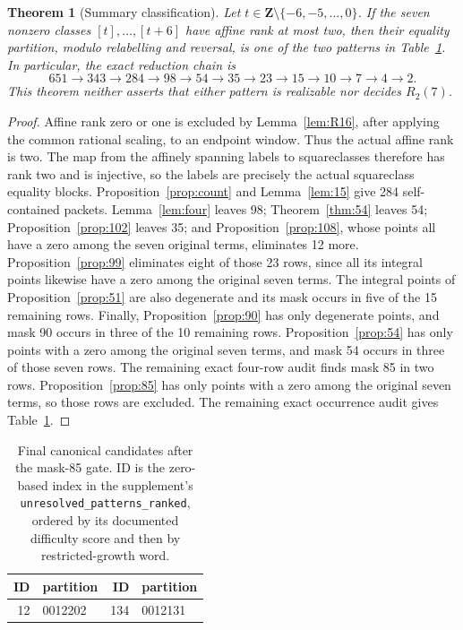 \documentclass[11pt]{article}
\newtheorem{theorem}{Theorem}
\begin{document}
\begin{theorem}[Summary classification]\label{thm:summary}
Let $t\in\mathbf Z\setminus\{-6,-5,\ldots,0\}$.  If the seven nonzero
classes $[t],\ldots,[t+6]$ have affine rank at most two, then their
equality partition, modulo relabelling and reversal, is one of the two
patterns in Table~\ref{tab:2}.  In particular, the exact reduction chain is
\[
651\longrightarrow343\longrightarrow284\longrightarrow98
\longrightarrow54\longrightarrow35\longrightarrow23\longrightarrow15
\longrightarrow10\longrightarrow7\longrightarrow4\longrightarrow2.
\]
This theorem neither asserts that either pattern is realizable nor
decides $R_2(7)$.
\end{theorem}
\begin{proof}
Affine rank zero or one is excluded by Lemma~\ref{lem:R16}, after applying
the common rational scaling, to an endpoint window.  Thus the actual affine
rank is two.  The map from the affinely spanning labels to squareclasses
therefore has rank two and is injective, so the labels are precisely the
actual squareclass equality blocks.  Proposition~\ref{prop:count} and
Lemma~\ref{lem:15} give 284 self-contained packets.  Lemma~\ref{lem:four}
leaves 98; Theorem~\ref{thm:54} leaves 54;
Proposition~\ref{prop:102} leaves 35; and Proposition~\ref{prop:108}, whose
points all have a zero among the seven original terms, eliminates 12 more.
Proposition~\ref{prop:99} eliminates eight of those 23 rows, since all its
integral points likewise have a zero among the original seven terms. The
integral points of Proposition~\ref{prop:51} are also degenerate and its mask
occurs in five of the 15 remaining rows. Finally, Proposition~\ref{prop:90}
has only degenerate points, and mask 90 occurs in three of the 10 remaining
rows.
Proposition~\ref{prop:54} has only points with a zero among the original seven
terms, and mask 54 occurs in three of those seven rows. The remaining exact
four-row audit finds mask 85 in two rows. Proposition~\ref{prop:85} has only
points with a zero among the original seven terms, so those rows are excluded.
The remaining exact occurrence audit gives Table~\ref{tab:2}.
\end{proof}

\begin{table}[ht]
\centering
\caption{Final canonical candidates after the mask-85 gate. ID is the zero-based index in the
supplement's \texttt{unresolved\_patterns\_ranked}, ordered by its documented
difficulty score and then by restricted-growth word.}\label{tab:2}
\begin{tabular}{r@{\quad}l r@{\quad}l}
\toprule
ID&partition&ID&partition\\ \midrule
12&0012202&134&0012131\\ \bottomrule
\end{tabular}
\end{table}
\end{document}
